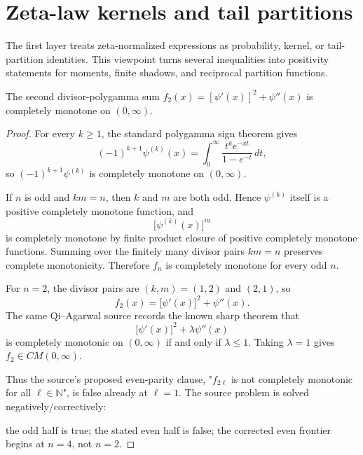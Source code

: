 \section{Zeta-law kernels and tail partitions}
The first layer treats zeta-normalized expressions as probability, kernel, or tail-partition identities.  This viewpoint turns several inequalities into positivity statements for moments, finite shadows, and reciprocal partition functions.
\begin{proposition}
\label{res:qa-divisor-polygamma-f2-cm}
The second divisor-polygamma sum \(f_2(x)=[\psi'(x)]^2+\psi''(x)\) is completely monotone on \((0,\infty)\).
\end{proposition}
\begin{proof}
For every \(k\ge1\), the standard polygamma sign theorem gives
\[
(-1)^{k+1}\psi^{(k)}(x)
=
\int_0^\infty \frac{t^k e^{-xt}}{1-e^{-t}}\,dt,
\]
so \((-1)^{k+1}\psi^{(k)}\) is completely monotone on \((0,\infty)\).

If \(n\) is odd and \(km=n\), then \(k\) and \(m\) are both odd. Hence \(\psi^{(k)}\) itself is a positive completely monotone function, and
\[
\bigl[\psi^{(k)}(x)\bigr]^m
\]
is completely monotone by finite product closure of positive completely monotone functions. Summing over the finitely many divisor pairs \(km=n\) preserves complete monotonicity. Therefore \(f_n\) is completely monotone for every odd \(n\).

For \(n=2\), the divisor pairs are \((k,m)=(1,2)\) and \((2,1)\), so
\[
f_2(x)=\bigl[\psi'(x)\bigr]^2+\psi''(x).
\]
The same Qi--Agarwal source records the known sharp theorem that
\[
\bigl[\psi'(x)\bigr]^2+\lambda\psi''(x)
\]
is completely monotonic on \((0,\infty)\) if and only if \(\lambda\le1\). Taking \(\lambda=1\) gives \(f_2\in CM(0,\infty)\).

Thus the source's proposed even-parity clause, "\(f_{2\ell}\) is not completely monotonic for all \(\ell\in\mathbb N\)", is false already at \(\ell=1\). The source problem is solved negatively/correctively:

the odd half is true;
the stated even half is false;
the corrected even frontier begins at \(n=4\), not \(n=2\).
\end{proof}

